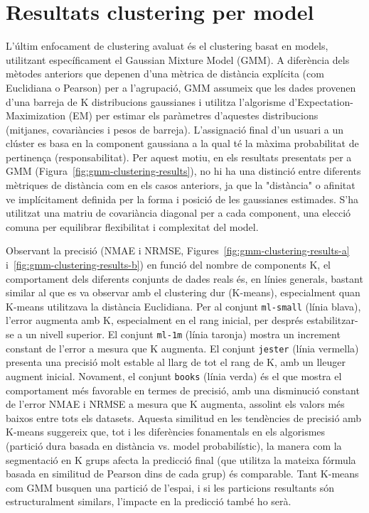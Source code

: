 \documentclass[a4paper,12pt]{report}
\begin{document}
\section{Resultats clustering per model}

L'últim enfocament de clustering avaluat és el clustering basat en models, utilitzant específicament el Gaussian Mixture Model (GMM). A diferència dels mètodes anteriors que depenen d'una mètrica de distància explícita (com Euclidiana o Pearson) per a l'agrupació, GMM assumeix que les dades provenen d'una barreja de K distribucions gaussianes i utilitza l'algorisme d'Expectation-Maximization (EM) per estimar els paràmetres d'aquestes distribucions (mitjanes, covariàncies i pesos de barreja). L'assignació final d'un usuari a un clúster es basa en la component gaussiana a la qual té la màxima probabilitat de pertinença (responsabilitat). Per aquest motiu, en els resultats presentats per a GMM (Figura~\ref{fig:gmm-clustering-results}), no hi ha una distinció entre diferents mètriques de distància com en els casos anteriors, ja que la "distància" o afinitat ve implícitament definida per la forma i posició de les gaussianes estimades. S'ha utilitzat una matriu de covariància diagonal per a cada component, una elecció comuna per equilibrar flexibilitat i complexitat del model.

Observant la precisió (NMAE i NRMSE, Figures~\ref{fig:gmm-clustering-results-a} i~\ref{fig:gmm-clustering-results-b}) en funció del nombre de components K, el comportament dels diferents conjunts de dades reals és, en línies generals, bastant similar al que es va observar amb el clustering dur (K-means), especialment quan K-means utilitzava la distància Euclidiana. Per al conjunt \texttt{ml-small} (línia blava), l'error augmenta amb K, especialment en el rang inicial, per després estabilitzar-se a un nivell superior. El conjunt \texttt{ml-1m} (línia taronja) mostra un increment constant de l'error a mesura que K augmenta. El conjunt \texttt{jester} (línia vermella) presenta una precisió molt estable al llarg de tot el rang de K, amb un lleuger augment inicial. Novament, el conjunt \texttt{books} (línia verda) és el que mostra el comportament més favorable en termes de precisió, amb una disminució constant de l'error NMAE i NRMSE a mesura que K augmenta, assolint els valors més baixos entre tots els datasets. Aquesta similitud en les tendències de precisió amb K-means suggereix que, tot i les diferències fonamentals en els algorismes (partició dura basada en distància vs. model probabilístic), la manera com la segmentació en K grups afecta la predicció final (que utilitza la mateixa fórmula basada en similitud de Pearson dins de cada grup) és comparable. Tant K-means com GMM busquen una partició de l'espai, i si les particions resultants són estructuralment similars, l'impacte en la predicció també ho serà.
\end{document}

